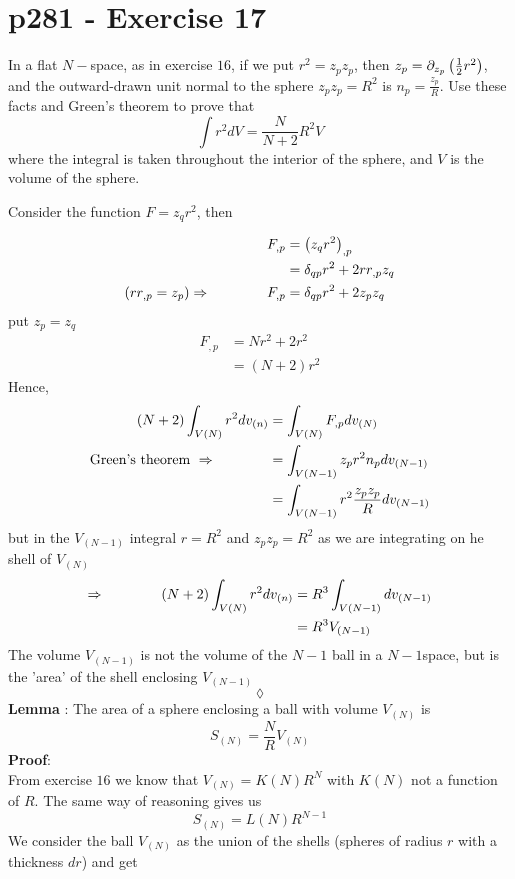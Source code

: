 \section{p281 - Exercise 17}
\begin{tcolorbox}
In a flat $N-$space, as in exercise $16$, if we put $r^2=z_pz_p$, then $z_p=\partial_{z_p}\left(\frac{1}{2} r^2\right)$, and the outward-drawn unit normal to the sphere $z_p z_p= R^2$ is $n_p= \frac{z_p}{R}$. Use these facts and Green's theorem to prove that
$$\int r^2dV = \frac{N}{N+2}R^2 V$$ where the integral is taken throughout the interior of the sphere, and $V$ is the volume of the sphere.
\end{tcolorbox}
Consider the function $F= z_q r^2$, then

\begin{align}
F_{,p}&= \left(z_q r^2\right)_{,p}\\
&= \delta_{qp}r^2+2rr_{,p}z_q\\
\left(r r_{,p}= z_p \right)\Rightarrow\quad\quad\quad\quad F_{,p}&= \delta_{qp}r^2+2z_pz_q\\
\end{align}
put $z_p=z_q$
\begin{align}
F_{,p}&= Nr^2+2r^2\\
&= \left(N+2 \right)r^2
\end{align}
Hence, 
\begin{align}
\left(N+2\right)\int_{V(N)} r^2 dv_{(n)} &= \int_{V(N)}F_{,p} dv_{(N)} \\
\text{Green's theorem }\Rightarrow\quad\quad\quad\quad &=  \int_{V(N-1)}z_p r^2 n_p dv_{(N-1)} \\
&=  \int_{V(N-1)}r^2 \frac{z_p z_p}{R} dv_{(N-1)} 
\end{align}
but in the $V_{(N-1)}$ integral $r=R^2$ and $z_p z_p = R^2$ as we are integrating on he shell of $V_{(N)}$
\begin{align}
\Rightarrow\quad\quad\quad\quad \left(N+2\right)\int_{V(N)} r^2 dv_{(n)} &=R^3 \int_{V(N-1)} dv_{(N-1)} \\
&=R^3 V_{(N-1)} 
\end{align}
The volume $V_{(N-1)} $ is not the volume of the $N-1$ ball in a $N-1$space, but is the 'area' of the shell enclosing $V_{(N-1)}$
$$\lozenge$$
\textbf{Lemma} : The area of a sphere enclosing a ball with volume $V_{(N)}$ is 
$$ S_{(N)} = \frac{N}{R} V_{(N)}$$
\textbf{Proof}:\\
From exercise $16$ we know that $V_{(N)}= K(N)R^N$ with $K(N)$ not a function of $R$. The same way of reasoning gives us 
$$S_{(N)}= L(N)R^{N-1}$$  
We consider the ball $V_{(N)}$ as the union of the shells (spheres of radius $r$ with a thickness $dr$) and get

